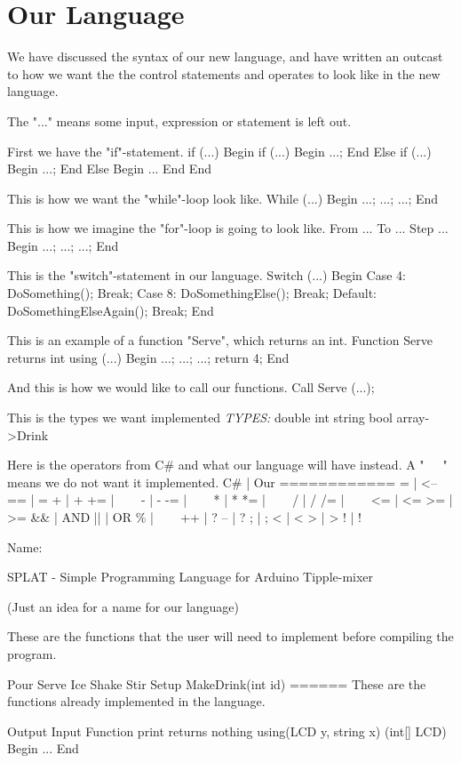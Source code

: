 \chapter{Our Language}
We have discussed the syntax of our new language, and have written an outcast to how we want the the control statements and operates to look like in the new language.

The "..." means some input, expression or statement is left out.

First we have the "if"-statement.
if (...)
Begin
	if (...)
	Begin
		...;
	End
	Else if (...)
	Begin
		...;
	End
	Else
	Begin
	...
	End
End

This is how we want the "while"-loop look like.
While (...)
Begin
	...;
	...;
	...;
End
	
This is how we imagine the "for"-loop is going to look like.
From ... To ... Step ...
Begin
	...;
	...;
	...;
End

This is the "switch"-statement in our language.
Switch (...)
Begin
	Case 4:
		DoSomething();
		Break;
	Case 8:
		DoSomethingElse();
		Break;
	Default:
		DoSomethingElseAgain();
	Break;
End

This is an example of a function "Serve", which returns an int.
Function Serve returns int using (...)
Begin
	...;
	...;
	...;
	return 4;
End

And this is how we would like to call our functions.
Call Serve (...);

This is the types we want implemented
\textit{TYPES:}
double
int
string
bool
array->Drink

Here is the operators from C\# and what our language will have instead. A "~~~" means we do not want it implemented.
C\#	|	Our
============
=  	|	<--
==	|	=
+	|	+
+=	|	~~~
-	|	-
-=	|	~~~
*	|	*
*=	|	~~~
/	|	/
/=	|	~~~
<=	|	<=
>=	|	>=
&&	|	AND
||	|	OR
\%	|	~~~
++	|	?
--	|	?
;	|	;
<	|	<
>	|	>
!	|	!


Name:

SPLAT - Simple Programming Language for Arduino Tipple-mixer


(Just an idea for a name for our language)







These are the functions that the user will need to implement before compiling the program.

Pour
Serve
Ice
Shake
Stir
Setup
MakeDrink(int id)
======
These are the functions already implemented in the language.

Output
Input
Function print returns nothing using(LCD y, string x)     (int[] LCD)
Begin
	...
End